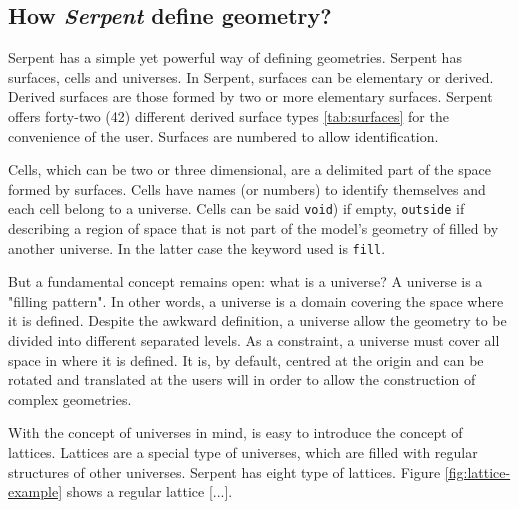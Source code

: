 \documentclass{elsarticle}
\begin{document}
\subsection{How \textit{Serpent} define geometry?}

Serpent has a simple yet powerful way of defining geometries. Serpent has 
surfaces, cells and universes. In Serpent, surfaces can be elementary or 
derived. Derived surfaces are those formed by two or more elementary surfaces. 
Serpent offers forty-two (42) different derived surface types \ref{tab:surfaces} for the convenience of the user. Surfaces are numbered to allow identification.

Cells, which can be two or three dimensional, are a delimited part of the space 
formed by surfaces. Cells have names (or numbers) to identify themselves and 
each cell belong to a universe. Cells can be said \texttt{void}) if 
empty, \texttt{outside} if describing a region of space that is not part 
of the model's geometry of filled by another universe. In the latter case the 
keyword used is \texttt{fill}.

But a fundamental concept remains open: what is a universe? A universe is a "filling pattern". In other words, a universe is a domain covering the space where it is defined. Despite the awkward definition, a universe allow the geometry to 
be divided into different separated levels. As a constraint, a universe must 
cover all space in where it is defined. It is, by default, centred at the 
origin and can be rotated and translated at the users will in order to allow 
the construction of complex geometries.

With the concept of universes in mind, is easy to introduce the concept of 
lattices. Lattices are a special type of universes, which are filled with 
regular structures of other universes. Serpent has eight type of lattices. 
Figure \ref{fig:lattice-example} shows a regular lattice [...].


\end{document}
